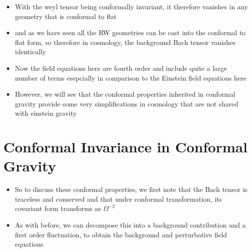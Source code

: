 \documentclass[10pt,letterpaper]{article}
\numberwithin{equation}{section}
\begin{document}
\begin{itemize}
	\item With the weyl tensor being conformally invariant, it therefore vanishes in any geometry that is conformal to flat
	\item and as we have seen all the RW geometries can be cast into the conformal to flat form, so therefore in cosmology, the background Bach tensor vanishes identically
	\item Now the field equations here are fourth order and include quite a large number of terms esepcially in comparison to the Einstein field equations here
	\item However, we will see that the conformal properties inherited in conformal gravity provide some very simplifications in cosmology that are not shared with einstein gravity
\end{itemize}


\section{Conformal Invariance in Conformal Gravity}
\begin{itemize}
	\item So to discuss these conformal properties, we first note that the Bach tensor is traceless and conserved and that under conformal transformation, its covariant form transforms as $\Omega^{-2}$
	\item As with before, we can decompose this into a background contribution and a first order fluctuation, to obtain the background and perturbative field equations
\end{itemize}

\end{document}
